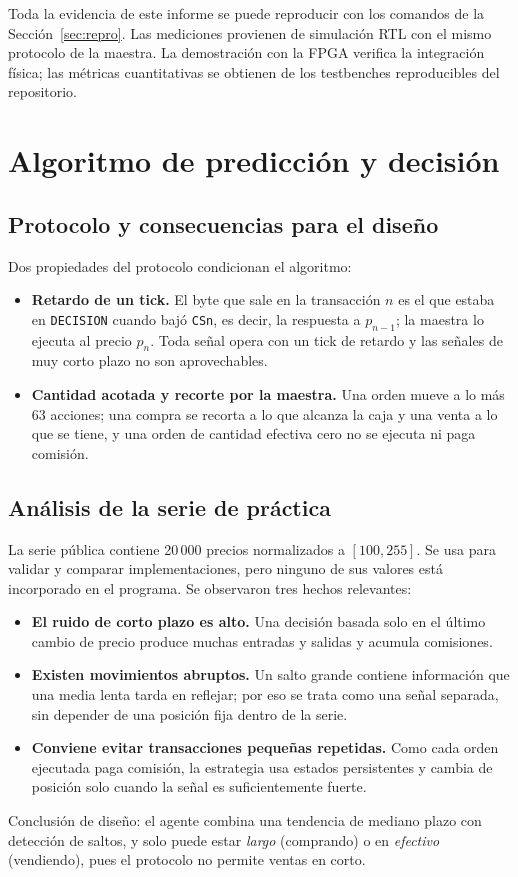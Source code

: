 \documentclass[11pt,letterpaper]{article}
\renewcommand{\_}{\textunderscore\allowbreak}
\begin{document}
Toda la evidencia de este informe se puede reproducir con los comandos de la Sección~\ref{sec:repro}. Las mediciones provienen de simulación RTL con el mismo protocolo de la maestra. La demostración con la FPGA verifica la integración física; las métricas cuantitativas se obtienen de los testbenches reproducibles del repositorio.

\section{Algoritmo de predicción y decisión}

\subsection{Protocolo y consecuencias para el diseño}
Dos propiedades del protocolo condicionan el algoritmo:
\begin{itemize}
  \item \textbf{Retardo de un tick.} El byte que sale en la transacción $n$ es el que estaba en \texttt{DECISION} cuando bajó \texttt{CS\_n}, es decir, la respuesta a $p_{n-1}$; la maestra lo ejecuta al precio $p_n$. Toda señal opera con un tick de retardo y las señales de muy corto plazo no son aprovechables.
  \item \textbf{Cantidad acotada y recorte por la maestra.} Una orden mueve a lo más 63 acciones; una compra se recorta a lo que alcanza la caja y una venta a lo que se tiene, y una orden de cantidad efectiva cero no se ejecuta ni paga comisión.
\end{itemize}

\subsection{Análisis de la serie de práctica}
La serie pública contiene 20\,000 precios normalizados a $[100,255]$. Se usa para validar y comparar implementaciones, pero ninguno de sus valores está incorporado en el programa. Se observaron tres hechos relevantes:
\begin{itemize}
  \item \textbf{El ruido de corto plazo es alto.} Una decisión basada solo en el último cambio de precio produce muchas entradas y salidas y acumula comisiones.
  \item \textbf{Existen movimientos abruptos.} Un salto grande contiene información que una media lenta tarda en reflejar; por eso se trata como una señal separada, sin depender de una posición fija dentro de la serie.
  \item \textbf{Conviene evitar transacciones pequeñas repetidas.} Como cada orden ejecutada paga comisión, la estrategia usa estados persistentes y cambia de posición solo cuando la señal es suficientemente fuerte.
\end{itemize}
Conclusión de diseño: el agente combina una tendencia de mediano plazo con detección de saltos, y solo puede estar \emph{largo} (comprando) o en \emph{efectivo} (vendiendo), pues el protocolo no permite ventas en corto.
\end{document}
